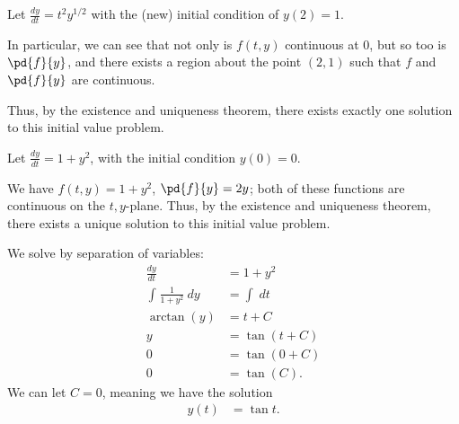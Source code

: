 \documentclass[10pt]{mypackage}
\begin{document}
\begin{example}
  Let $\frac{dy}{dt} = t^2y^{1/2}$ with the (new) initial condition of $y(2) = 1$.\newline

  In particular, we can see that not only is $f(t,y)$ continuous at $0$, but so too is $\pd{f}{y}$, and there exists a region about the point $(2,1)$ such that $f$ and $\pd{f}{y}$ are continuous.\newline

  Thus, by the existence and uniqueness theorem, there exists exactly one solution to this initial value problem.
\end{example}
\begin{example}
  Let $\frac{dy}{dt} = 1 + y^2$, with the initial condition $y(0) = 0$.\newline

  We have $f(t,y) = 1 + y^2$, $\pd{f}{y} = 2y$; both of these functions are continuous on the $t,y$-plane. Thus, by the existence and uniqueness theorem, there exists a unique solution to this initial value problem.\newline

  We solve by separation of variables:
  \begin{align*}
    \frac{dy}{dt} &= 1 + y^2\\
    \int_{}^{} \frac{1}{1+y^2}\:dy &= \int_{}^{} \:dt\\
    \arctan(y) &= t + C\\
    y &= \tan\left(t + C\right)\\
    0 &= \tan\left(0 + C\right)\\
    0 &= \tan\left(C\right).
  \end{align*}
  We can let $C = 0$, meaning we have the solution
  \begin{align*}
    y(t) &= \tan t.
  \end{align*}
  \begin{center}
  \end{center}
\end{example}
\end{document}
